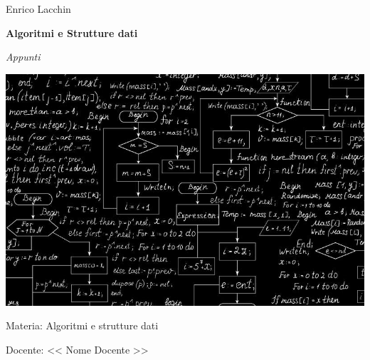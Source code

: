 \documentclass[12pt,a4paper]{article}
\begin{document}

\small{Enrico Lacchin}

\MidSep
\textbf{\LARGE{Algoritmi e Strutture dati}}

\MidSep
\textit{\Large{Appunti}}
\Sep

\begin{center}
\includegraphics[width=1\columnwidth]{img/algoritmo.jpg}
\end{center}

\vfill
Materia: Algoritmi e strutture dati

Docente: << Nome Docente >>

\clearpage
{}
\setcounter{page}{1}
\tableofcontents

\clearpage

\setcounter{page}{1}
\end{document}
